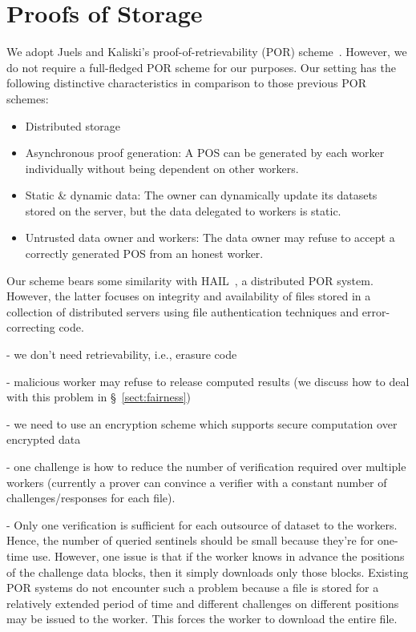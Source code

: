 \section{Proofs of Storage} \label{sect:pos}

We adopt Juels and Kaliski's proof-of-retrievability (POR) scheme~\cite{JK07}.
However, we do not require a full-fledged POR scheme for our purposes.
Our setting has the following distinctive characteristics in comparison to those previous POR schemes:
\begin{itemize}
 \item Distributed storage
 \item Asynchronous proof generation: A POS can be generated by each worker individually without being dependent on other workers.
 \item Static \& dynamic data: The owner can dynamically update its datasets stored on the server, but the data delegated to workers is static.
 \item Untrusted data owner and workers: The data owner may refuse to accept a correctly generated POS from an honest worker.
\end{itemize}

Our scheme bears some similarity with HAIL~\cite{BJO09b}, a distributed POR system.
However, the latter focuses on integrity and availability of files stored in a collection of distributed servers using file authentication techniques and error-correcting code.

- we don't need retrievability, i.e., erasure code

- malicious worker may refuse to release computed results (we discuss how to deal with this problem in \S~\ref{sect:fairness})

- we need to use an encryption scheme which supports secure computation over encrypted data

- one challenge is how to reduce the number of verification required over multiple workers (currently a prover can convince a verifier with a constant number of challenges/responses for each file). 

- Only one verification is sufficient for each outsource of dataset to the workers. Hence, the number of queried sentinels should be small because they're for one-time use. However, one issue is that if the worker knows in advance the positions of the challenge data blocks, then it simply downloads only those blocks. Existing POR systems do not encounter such a problem because a file is stored for a relatively extended period of time and different challenges on different positions may be issued to the worker. This forces the worker to download the entire file.

